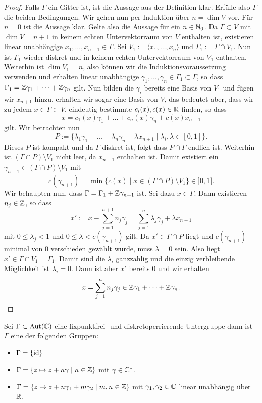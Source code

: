 \begin{proof}
  Falls $\Gamma$ ein Gitter ist, ist die Aussage aus der Definition
  klar. Erfülle also $\Gamma$ die beiden Bedingungen. Wir gehen nun
  per Induktion über $n = \dim V$ vor. Für $n = 0$ ist die Aussage klar. Gelte also die
  Aussage für ein $n \in \mathbb{N}_0$. Da $\Gamma \subset V$ mit $\dim V =
  n+1$ in keinem echten
  Untervektorraum von $V$ enthalten ist, existieren linear unabhängige $x_1, \dots,
  x_{n+1} \in \Gamma$. Sei $V_1 := \langle x_1, \dots, x_n \rangle$
  und $\Gamma_1 := \Gamma \cap V_1$. Nun ist $\Gamma_1$ wieder diskret
  und in keinem echten Untervektorraum von $V_1$ enthalten. Weiterhin
  ist $\dim V_1 = n$, also können wir die Induktionsvoraussetzung
  verwenden und erhalten linear unabhängige $\gamma_1, \dots, \gamma_n
  \in \Gamma_1 \subset \Gamma$, so dass $\Gamma_1 = \mathbb{Z} \gamma_1 +
  \dots + \mathbb{Z} \gamma_n$ gilt. Nun bilden die $\gamma_i$ bereits eine
  Basis von $V_1$ und fügen wir $x_{n+1}$ hinzu, erhalten wir sogar eine Basis
  von $V$, das bedeutet aber, dass wir zu jedem $x \in \Gamma \subset
  V$, eindeutig bestimmte $c_i(x), c(x) \in \mathbb{R}$ finden, so dass
  \[
  x = c_1(x) \gamma_1 + \dots + c_n(x) \gamma_n + c(x) x_{n+1}
  \]
  gilt. Wir betrachten nun
  \[
  P := \{ \lambda_1 \gamma_1 + \dots + \lambda_n \gamma_n + \lambda
  x_{n+1} \mid \lambda_i, \lambda \in [0,1] \}.
  \]
  Dieses $P$ ist kompakt und da $\Gamma$ diskret ist, folgt dass $P
  \cap \Gamma$ endlich ist. Weiterhin ist $( \Gamma \cap P) \setminus
  V_1$ nicht leer, da $x_{n+1}$ enthalten ist. Damit existiert ein
  $\gamma_{n+1} \in ( \Gamma \cap P) \setminus V_1$ mit
  \[
  c(\gamma_{n+1}) = \min \{ c(x) \mid x \in ( \Gamma \cap P ) \setminus
  V_1 \} \in ]0, 1].
  \]
  Wir behaupten nun, dass $\Gamma = \Gamma_1 + \mathbb{Z} \gamma_{n+1}$ ist. Sei
  dazu $x \in \Gamma$. Dann existieren $n_j \in \mathbb{Z}$, so dass
  \[
  x' := x - \sum_{j=1}^{n+1} n_j \gamma_j = \sum_{j=1}^n \lambda_j
  \gamma_j + \lambda x_{n+1}
  \]
  mit $0 \leq \lambda_j < 1$ und $0 \leq \lambda < c(\gamma_{n+1})$
  gilt. Da $x' \in \Gamma \cap P$ liegt und $c(\gamma_{n+1})$ minimal
  von 0 verschieden gewählt wurde, muss $\lambda = 0$ sein. Also liegt
  $x' \in \Gamma \cap V_1 = \Gamma_1$. Damit sind die $\lambda_i$
  ganzzahlig und die einzig verbleibende Möglichkeit ist $\lambda_i =
  0$. Dann ist aber $x'$ bereits 0 und wir erhalten 
  \[
  x = \sum_{j=1}^n n_j \gamma_j \in \mathbb{Z} \gamma_1 + \dots + \mathbb{Z} \gamma_n.
  \]
\end{proof}

\begin{prop}
  Sei $\Gamma \subset \operatorname{Aut}(\mathbb{C})$ eine fixpunktfrei- und
  diskretoperrierende Untergruppe dann ist $\Gamma$ eine der folgenden
  Gruppen:
  \begin{itemize}
  \item $\Gamma = \{\operatorname{id}\}$
  \item $\Gamma = \{z \mapsto z + n\gamma \mid n \in \mathbb{Z}\}$ mit $\gamma \in \mathbb{C}^\ast$.
  \item $\Gamma = \{z \mapsto z + n\gamma_1 + m \gamma_2 \mid m,n \in
    \mathbb{Z}\}$ mit $\gamma_1, \gamma_2 \in \mathbb{C}$ linear unabhängig über $\mathbb{R}$.
  \end{itemize}
\end{prop}

